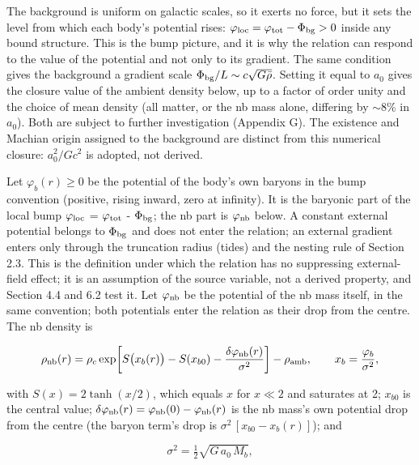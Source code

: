 \documentclass[
  10pt,
]{article}
\begin{document}
The background is uniform on galactic scales, so it exerts no force, but it sets the level from which each body's potential rises: $\varphi_{\rm loc}=\varphi_{\rm tot}-\Phi_{\rm bg}>0$ inside any bound structure. This is the bump picture, and it is why the relation can respond to the value of the potential and not only to its gradient. The same condition gives the background a gradient scale $\Phi_{\rm bg}/L\sim c\sqrt{G\bar\rho}$. Setting it equal to $a_0$ gives the closure value of the ambient density below, up to a factor of order unity and the choice of mean density (all matter, or the nb mass alone, differing by $\sim$8\% in $a_0$). Both are subject to further investigation (Appendix G). The existence and Machian origin assigned to the background are distinct from this numerical closure: $a_0^2/Gc^2$ is adopted, not derived.

Let $\varphi_b(r)\ge 0$ be the potential of the body's own baryons
in the bump convention (positive, rising inward, zero at infinity). It is
the baryonic part of the local bump
$\varphi_{\rm loc}$ = $\varphi_{\rm tot}$ - $\Phi_{\rm bg}$; the nb part is $\varphi_{\rm nb}$ below. A constant external potential belongs to
$\Phi_{\rm bg}$ and does not enter the relation; an external gradient enters only
through the truncation radius (tides) and the nesting rule of Section
2.3. This is the definition under which the relation has no suppressing
external-field effect; it is an assumption of the source variable, not a
derived property, and Section 4.4 and 6.2 test it. Let $\varphi_{\rm nb}$ be the
potential of the nb mass itself, in the same convention; both potentials
enter the relation as their drop from the centre. The nb density is

\begin{equation}
\rho_{\rm nb}(r)=\rho_c\exp\!\left[S\big(x_b(r)\big)-S(x_{b0})-\frac{\delta\varphi_{\rm nb}(r)}{\sigma^2}\right]-\rho_{\rm amb},\qquad x_b=\frac{\varphi_b}{\sigma^2},
\end{equation}

with $S(x)=2\tanh(x/2)$, which equals $x$ for $x\ll 2$ and
saturates at 2; $x_{b0}$ is the central value; $\delta\varphi_{\rm nb}(r)=\varphi_{\rm nb}(0)-\varphi_{\rm nb}(r)$ is the nb mass's own potential drop from the
centre (the baryon term's drop is $\sigma^2\,[x_{b0}-x_b(r)]$); and

\begin{equation}
\sigma^2=\tfrac12\sqrt{G\,a_0\,M_b},
\end{equation}
\end{document}
